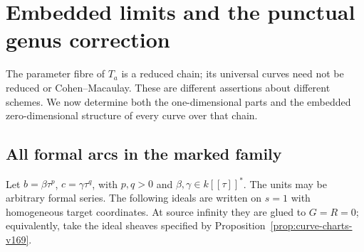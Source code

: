 \section{Embedded limits and the punctual genus correction}
\label{sec:embedded-limits-v169}
The parameter fibre of $T_a$ is a reduced chain; its universal curves
need not be reduced or Cohen--Macaulay. These are different assertions
about different schemes. We now determine both the one-dimensional
parts and the embedded zero-dimensional structure of every curve over
that chain.

\subsection{All formal arcs in the marked family}
Let $b=\beta\tau^p$, $c=\gamma\tau^q$, with $p,q>0$ and
$\beta,\gamma\in k[[\tau]]^*$. The units may be arbitrary formal
series. The following ideals are written on $s=1$ with homogeneous
target coordinates. At source infinity they are glued to $G=R=0$;
equivalently, take the ideal sheaves specified by
Proposition~\ref{prop:curve-charts-v169}.

